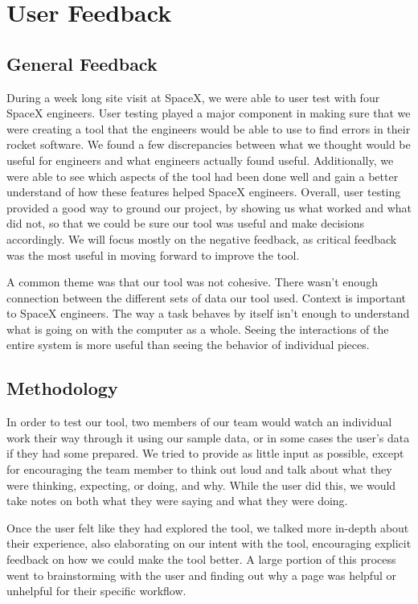 \documentclass{hmcclinic}
\begin{document}
\chapter{User Feedback} %
\section{General Feedback} %
During a week long site visit at SpaceX, we were able to user test with four SpaceX engineers. 
User testing played a major component in making sure that we were creating a
tool that the engineers would be able to use to find errors in their rocket
software. We found a few discrepancies between what we thought would be useful
for engineers and what engineers actually found useful. Additionally, we were
able to see which aspects of the tool had been done well and gain a better
understand of how these features helped SpaceX engineers. Overall, user testing
provided a good way to ground our project, by showing us what worked and what
did not, so that we could be sure our tool was useful and make decisions
accordingly. We will focus mostly on the negative feedback, as critical feedback
was the most useful in moving forward to improve the tool.

A common theme was that our tool was not cohesive. There wasn't enough
connection between the different sets of data our tool used. Context is
important to SpaceX engineers. The way a task behaves by itself isn't
enough to understand what is going on with the computer as a whole. Seeing the
interactions of the entire system is more useful than seeing the behavior of individual pieces.

\section{Methodology} %
In order to test our tool, two members of our team would watch an individual
work their way through it using our sample data, or in some cases the user's
data if they had some prepared. We tried to provide as little
input as possible, except for encouraging the team member to think out loud and
talk about what they were thinking, expecting, or doing, and why. While the user
did this, we would take notes on both what they were saying and what they were
doing.

Once the user felt like they had explored the tool, we talked more in-depth
about their experience, also elaborating on our intent with the tool,
encouraging explicit feedback on how we could make the tool better. A large
portion of this process went to brainstorming with the user and finding out why
a page was helpful or unhelpful for their specific workflow.
\end{document}
